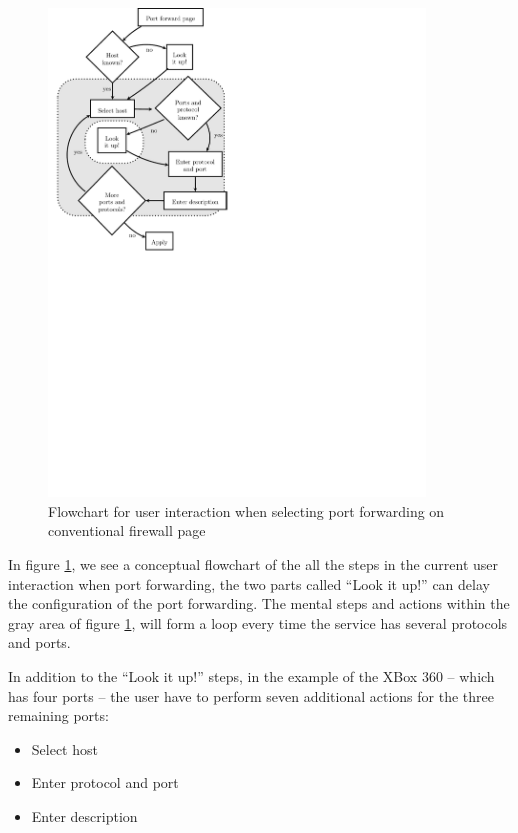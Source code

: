 \documentclass[g5paper,11pt]{kth-bcs}
\begin{document}
\begin{figure}[h]
   \centering
   \includegraphics[trim = 0mm 140mm 90mm 0mm, clip, width=10cm]{before}
   \caption{Flowchart for user interaction when selecting port forwarding on conventional firewall page}
   \label{fig:before}
\end{figure}

In figure \ref{fig:before}, we see a conceptual flowchart of the all the steps in the current user interaction when port forwarding, the two parts called ``Look it up!'' can delay the configuration of the port forwarding.
The mental steps and actions within the gray area of figure \ref{fig:before}, will form a loop every time the service has several protocols and ports.

In addition to the ``Look it up!'' steps, in the example of the XBox 360 -- which has four ports -- the user have to perform seven additional actions for the three remaining ports:
\begin{itemize}
   \item Select host
   \item Enter protocol and port
   \item Enter description
\end{itemize}
\end{document}
